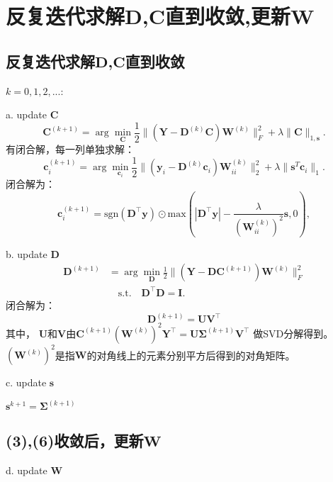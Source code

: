 \documentclass[10pt,twocolumn,letterpaper]{article}
\begin{document}
\section{反复迭代求解$\mathbf{D}$,$\mathbf{C}$直到收敛,更新$\mathbf{W}$ }
\subsection{反复迭代求解$\mathbf{D}$,$\mathbf{C}$直到收敛}
$k=0,1,2,...$:

a. update $\mathbf{C}$
\begin{equation}
\mathbf{C}^{(k+1)}
=
\arg\min_{\mathbf{C}}\frac{1}{2}\|(\mathbf{Y}-\mathbf{D}^{(k)}\mathbf{C})\mathbf{W}^{(k)}\|_{F}^{2}
+
\lambda\|\mathbf{C}\|_{1,\mathbf{s}}.
\end{equation}
有闭合解，每一列单独求解：
\begin{equation}
\mathbf{c}_{i}^{(k+1)}
=
\arg\min_{\mathbf{c}_{i}}\frac{1}{2}\|(\mathbf{y}_{i}-\mathbf{D}^{(k)}\mathbf{c}_{i})\mathbf{W}_{ii}^{(k)}\|_{2}^{2}
+
\lambda\|\mathbf{s}^{T}\mathbf{c}_{i}\|_{1}.
\end{equation}
闭合解为：
\begin{equation}
\mathbf{c}_{i}^{(k+1)} 
=
\text{sgn}(\mathbf{D^{\top}y}) 
\odot 
\text{max}(|\mathbf{D^{\top}y}|-\frac{\lambda}{(\mathbf{W}_{ii}^{(k)})^{2}}\mathbf{s},0),
\end{equation}

b. update $\mathbf{D}$
\begin{equation}
\begin{split}
\mathbf{D}^{(k+1)}
&
=
\arg\min_{\mathbf{D}}\frac{1}{2}\|(\mathbf{Y}-\mathbf{D}\mathbf{C}^{(k+1)})\mathbf{W}^{(k)}\|_{F}^{2}
\\
&
\quad
\text{s.t.}
\quad
\mathbf{D}^{\top}\mathbf{D} =\mathbf{I}. 
\end{split}
\end{equation}
闭合解为：
\begin{equation}
\mathbf{D}^{(k+1)}
=
\mathbf{U}\mathbf{V}^{\top}
\end{equation}
其中，
$\mathbf{U}$和$\mathbf{V}$由$\mathbf{C}^{(k+1)}(\mathbf{W}^{(k)})^{2}\mathbf{Y}^{\top}=\mathbf{U}\mathbf{\Sigma}^{(k+1)}\mathbf{V}^{\top}
$
做SVD分解得到。$(\mathbf{W}^{(k)})^{2}$是指$\mathbf{W}$的对角线上的元素分别平方后得到的对角矩阵。

c. update $\mathbf{s}$

$\mathbf{s}^{k+1}=\mathbf{\Sigma}^{(k+1)}$

\subsection{(3),(6)收敛后，更新$\mathbf{W}$}
d. update $\mathbf{W}$
\end{document}
